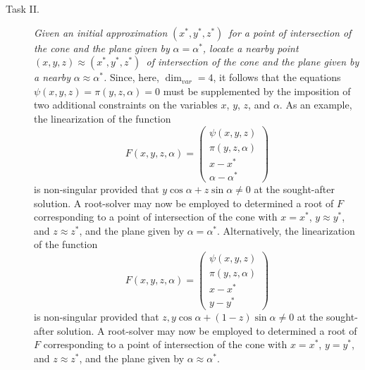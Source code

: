 \documentclass{article}
\begin{document}
\begin{description}
\item[Task II.] \emph{Given an initial approximation }$\left( x^{\ast
},y^{\ast },z^{\ast }\right) $\emph{\ for a point of intersection of the
cone and the plane given by }$\alpha =\alpha ^{\ast }$\emph{, locate a
nearby point }$\left( x,y,z\right) \approx \left( x^{\ast },y^{\ast
},z^{\ast }\right) $\emph{\ of intersection of the cone and the plane given
by a nearby }$\alpha \approx \alpha ^{\ast }$\emph{.} Since, here, $\dim
_{var}=4$, it follows that the equations $\psi \left( x,y,z\right) =\pi
\left( y,z,\alpha \right) =0$ must be supplemented by the imposition of two
additional constraints on the variables $x$, $y$, $z$, and $\alpha $. As an
example, the linearization of the function%
\begin{equation}
F\left( x,y,z,\alpha \right) =\left( 
\begin{array}{c}
\psi \left( x,y,z\right)  \\ 
\pi \left( y,z,\alpha \right)  \\ 
x-x^{\ast } \\ 
\alpha -\alpha ^{\ast }%
\end{array}%
\right)   \label{eq: task ii a)}
\end{equation}%
is non-singular provided that $y\cos \alpha +z\sin \alpha \neq 0$ at the
sought-after solution. A root-solver may now be employed to determined a
root of $F$ corresponding to a point of intersection of the cone with $%
x=x^{\ast }$, $y\approx y^{\ast }$, and $z\approx z^{\ast }$, and the plane
given by $\alpha =\alpha ^{\ast }$. Alternatively, the linearization of the
function%
\begin{equation}
F\left( x,y,z,\alpha \right) =\left( 
\begin{array}{c}
\psi \left( x,y,z\right)  \\ 
\pi \left( y,z,\alpha \right)  \\ 
x-x^{\ast } \\ 
y-y^{\ast }%
\end{array}%
\right)   \label{eq: task ii b)}
\end{equation}%
is non-singular provided that $z,y\cos \alpha +\left( 1-z\right) \sin \alpha
\neq 0$ at the sought-after solution. A root-solver may now be employed to
determined a root of $F$ corresponding to a point of intersection of the
cone with $x=x^{\ast }$, $y=y^{\ast }$, and $z\approx z^{\ast }$, and the
plane given by $\alpha \approx \alpha ^{\ast }$.
\end{description}
\end{document}
